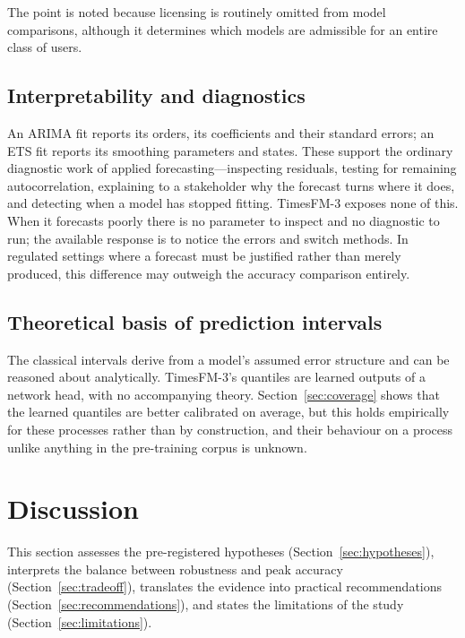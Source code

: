 \documentclass[11pt]{article}
\providecommand{\sectionref}[1]{Section~\ref{#1}}
\begin{document}
The point is noted because licensing is routinely omitted from model comparisons, although it
determines which models are admissible for an entire class of users.

\subsection{Interpretability and diagnostics}
\label{sec:interpret}

An ARIMA fit reports its orders, its coefficients and their standard errors; an ETS fit reports
its smoothing parameters and states. These support the ordinary diagnostic work of applied
forecasting---inspecting residuals, testing for remaining autocorrelation, explaining to a
stakeholder why the forecast turns where it does, and detecting when a model has stopped
fitting. TimesFM-3 exposes none of this. When it forecasts poorly there is no parameter to
inspect and no diagnostic to run; the available response is to notice the errors and switch
methods. In regulated settings where a forecast must be justified rather than merely produced,
this difference may outweigh the accuracy comparison entirely.

\subsection{Theoretical basis of prediction intervals}
\label{sec:intervals}

The classical intervals derive from a model's assumed error structure and can be reasoned about
analytically. TimesFM-3's quantiles are learned outputs of a network head, with no accompanying
theory. \sectionref{sec:coverage} shows that the learned quantiles are better calibrated on
average, but this holds empirically for these processes rather than by construction, and their
behaviour on a process unlike anything in the pre-training corpus is unknown.

\section{Discussion}
\label{sec:discussion}

This section assesses the pre-registered hypotheses (\sectionref{sec:hypotheses}), interprets the
balance between robustness and peak accuracy (\sectionref{sec:tradeoff}), translates the evidence
into practical recommendations (\sectionref{sec:recommendations}), and states the limitations of
the study (\sectionref{sec:limitations}).
\end{document}
